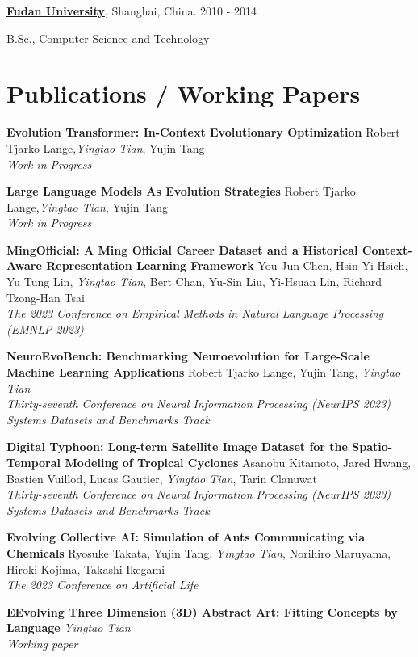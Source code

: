 \documentclass[line,margin]{cv}
\newenvironment{block}
{
  \begin{addmargin}[2em]{0em}%
}
{
  \end{addmargin}
}
\newcommand{\Fudan}{\href{http://www.fudan.edu.cn/englishnew/}{Fudan University}}
\begin{document}
\begin{resume}
  {\bf \Fudan}, Shanghai, China. \hfill 2010 - 2014

  \begin{block}
    B.Sc., Computer Science and Technology 
  \end{block}



\section{Publications / Working Papers}

  {\bf Evolution Transformer: In-Context Evolutionary Optimization}
  Robert Tjarko Lange,\emph{Yingtao Tian}, Yujin Tang\\
  \emph{Work in Progress}
  
  {\bf Large Language Models As Evolution Strategies}
  Robert Tjarko Lange,\emph{Yingtao Tian}, Yujin Tang\\
  \emph{Work in Progress}
  
  {\bf MingOfficial: A Ming Official Career Dataset and a Historical Context-Aware Representation Learning Framework}
  You-Jun Chen, Hsin-Yi Hsieh, Yu Tung Lin, \emph{Yingtao Tian}, Bert Chan, Yu-Sin Liu, Yi-Hsuan Lin, Richard Tzong-Han Tsai\\
  \emph{The 2023 Conference on Empirical Methods in Natural Language Processing (EMNLP 2023)}

  {\bf NeuroEvoBench: Benchmarking Neuroevolution for Large-Scale Machine Learning Applications}
  Robert Tjarko Lange, Yujin Tang, \emph{Yingtao Tian}\\
  \emph{Thirty-seventh Conference on Neural Information Processing (NeurIPS 2023) Systems Datasets and Benchmarks Track}

  {\bf Digital Typhoon: Long-term Satellite Image Dataset for the Spatio-Temporal Modeling of Tropical Cyclones}
  Asanobu Kitamoto, Jared Hwang, Bastien Vuillod, Lucas Gautier, \emph{Yingtao Tian}, Tarin Clanuwat\\
  \emph{Thirty-seventh Conference on Neural Information Processing (NeurIPS 2023) Systems Datasets and Benchmarks Track}

  {\bf Evolving Collective AI: Simulation of Ants Communicating via Chemicals}
  Ryosuke Takata, Yujin Tang, \emph{Yingtao Tian}, Norihiro Maruyama, Hiroki Kojima, Takashi Ikegami\\
  \emph{The 2023 Conference on Artificial Life}

  {\bf EEvolving Three Dimension (3D) Abstract Art: Fitting Concepts by Language}
  \emph{Yingtao Tian}\\
  \emph{Working paper}


\end{resume}
\end{document}
